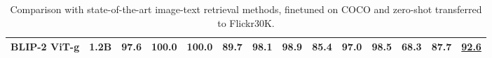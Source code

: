 \begin{table}[!t]
{\begin{tabular}	{l l |  c  c  c  c   c  c | c  c  c  c  c  c }
    \textbf{BLIP-2} ViT-g & 1.2B
     & \textbf{97.6} & \textbf{100.0}&\textbf{100.0}  &  \textbf{89.7}& \textbf{98.1} &\textbf{98.9}
    & \textbf{85.4} &  \textbf{97.0} &\textbf{98.5}& \textbf{68.3} & \textbf{87.7} &\underline{92.6}\\  
    \bottomrule
	\end{tabular}
	}
  \vspace{-2ex}
	\caption
	{
	\small	
        Comparison with state-of-the-art image-text retrieval methods, finetuned on COCO and zero-shot transferred to Flickr30K.
	}
	\label{tbl:retrieval}
 \vspace{-1ex}
\end{table}		


	     
